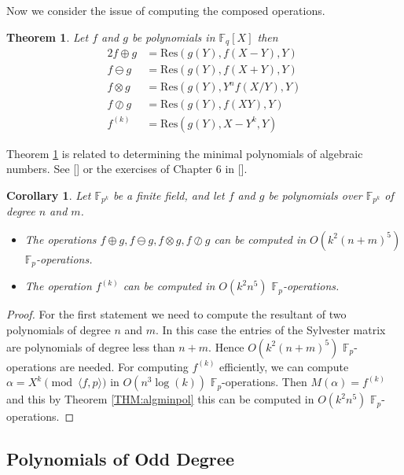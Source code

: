\documentclass{article}
\newcounter{dummy} \numberwithin{dummy}{section}
\theoremstyle{plain}
\newtheorem{thm}[dummy]{Theorem}
\newtheorem{cor}[dummy]{Corollary}
\theoremstyle{definition}
\def\Fp {{ \mathbb{F} _ {p} }}
\def\Fq {{ \mathbb{F} _ {q} }}
\def\FpE {{ \mathbb{F} _ {p^k} }}
\def\Res {{ \mathrm{Res}}}
\begin{document}
	  Now we consider the issue of computing the composed operations. 
		
	  \begin{thm} 
		\label{THM:opsRes}
		    Let $f$ and $g$ be polynomials in $\Fq[X]$ then
				\begin{alignat*}{2}
		    f \oplus g  &= \Res(g(Y),f(X-Y),Y)     \\
				f \ominus g &= \Res(g(Y),f(X+Y),Y)     \\
				f \otimes g &= \Res(g(Y),Y^nf(X/Y),Y)  \\
				f \oslash g &= \Res(g(Y),f(XY),Y)      \\
				f ^ {(k)}   &= \Res(g(Y),X-Y^k,Y)      
				\end{alignat*}
		\end{thm}
		
		Theorem \ref{THM:opsRes} is related to determining the minimal polynomials of algebraic numbers. See [] or the exercises of Chapter 6 in [].
				
		\begin{cor}
		\label{COR:compTimes}
		    Let $\FpE$ be a finite field, and let $f$ and $g$ be polynomials over $\FpE$ of degree $n$ and $m$. 
				\begin{itemize}
				    \item The operations $f \oplus g, f \ominus g, f \otimes g,f \oslash g$ can be computed in $O(k^2(n+m)^5)$ $\Fp$-operations.
				    \item The operation $f ^ {(k)}$ can be computed in $O( k^2n^5 )$ $\Fp$-operations.
				\end{itemize}
		\end{cor}
		
		\begin{proof}
		    For the first statement we need to compute the resultant of two polynomials of degree $n$ and $m$. In this case the entries of the Sylvester matrix are polynomials of degree less than $n+m$. Hence $O(k^2(n+m)^5)$ $\Fp$-operations are needed. 
				For computing $f ^ {(k)}$ efficiently, we can compute $\alpha=X^k \pmod { \langle f,p \rangle }$ in $O( n^3\log(k) )$ $\Fp$-operations. Then $M(\alpha)=f^{(k)}$ and this by Theorem \ref{THM:algminpol} this can be computed in $O( k^2n^5 )$ $\Fp$-operations. 
		\end{proof}
					
    \subsection{Polynomials of Odd Degree}
		\label{SEC:OddDeg}
		
\end{document}

